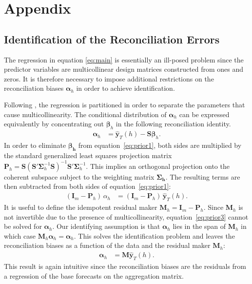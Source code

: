 \appendix
\section{Appendix}
\def\thepage{A\arabic{page}}

\subsection{Identification of the Reconciliation Errors}
\label{sec:proofs}
The regression in equation \ref{eq:main} is essentially an ill-posed problem since the predictor variables are multicollinear design matrices constructed from ones and zeros. It is therefore necessary to impose additional restrictions on the reconciliation biases $\boldsymbol{\alpha}_h$ in order to achieve identification. 

Following \cite{Farebrother1978}, the regression is partitioned in order to separate the parameters that cause multicollinearity. The conditional distribution of $\boldsymbol{\alpha}_h$ can be expressed equivalently by concentrating out $\boldsymbol{\beta}_h$ in the following reconciliation identity.
\begin{align}
	\label{eq:prior1}
	\boldsymbol{\alpha}_h &= \mathbf{\hat{y}}_{T}(h) - \textbf{S}\boldsymbol{\beta}_h.
\end{align}
In order to eliminate $\boldsymbol{\beta_h}$ from equation~\eqref{eq:prior1}, both sides are multiplied by the standard generalized least squares projection matrix $\textbf{P}_h = \textbf{S}(\textbf{S}'\boldsymbol{\Sigma}_h^{-1} \textbf{S})^{-1}\textbf{S}'\boldsymbol{\Sigma}_h^{-1}$. This implies an orthogonal projection onto the coherent subspace subject to the weighting matrix $\boldsymbol{\Sigma_h}$. The resulting terms are then subtracted from both sides of equation~\eqref{eq:prior1}:
\begin{align}
	\label{eq:prior3}
	(\textbf{I}_m - \textbf{P}_h)\, \alpha_h &= (\textbf{I}_m - \textbf{P}_h)\, \mathbf{\hat{y}}_{T}(h).
\end{align}
It is useful to define the idempotent residual maker $\textbf{M}_h = \textbf{I}_m - \textbf{P}_h$. Since $\textbf{M}_h$ is not invertible due to the presence of multicollinearity, equation~\eqref{eq:prior3} cannot be solved for $\boldsymbol{\alpha}_h$. Our identifying assumption is that $\boldsymbol{\alpha}_h$ lies in the span of $\textbf{M}_h$ in which case $\textbf{M}_h\boldsymbol{\alpha}_h = \boldsymbol{\alpha}_h$. This solves the identification problem and leaves the reconciliation biases as a function of the data and the residual maker $\textbf{M}_h$:
\begin{align}
	\boldsymbol{\alpha}_h &= \textbf{M} \mathbf{\hat{y}}_{T}(h).
\end{align}
This result is again intuitive since the reconciliation biases are the residuals from a regression of the base forecasts on the aggregation matrix.

